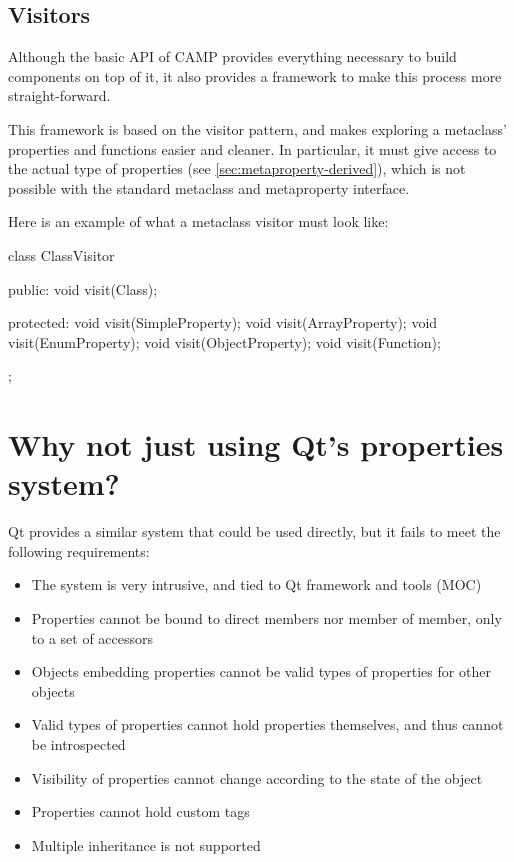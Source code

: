 \documentclass[a4paper, twoside]{report}
\begin{document}
\section{Visitors}
\label{sec:visitor}

	Although the basic API of CAMP provides everything necessary to build components on top of it, it
	also provides a framework to make this process more straight-forward.
	
	This framework is based on the visitor pattern, and makes exploring a metaclass' properties and
	functions easier and cleaner. In particular, it must give access to the actual type of properties
	(see \ref{sec:metaproperty-derived}), which is not possible with the standard metaclass and metaproperty
	interface.

	Here is an example of what a metaclass visitor must look like:
	
\begin{cppcode}
class ClassVisitor
{
public:
  void visit(Class);
    
protected:
  void visit(SimpleProperty);
  void visit(ArrayProperty);
  void visit(EnumProperty);
  void visit(ObjectProperty);
  void visit(Function);
};
\end{cppcode}

\appendix

\chapter{Why not just using Qt's properties system?}

	Qt provides a similar system that could be used directly, but it fails to meet the following requirements:
	
	\begin{itemize}
		\item The system is very intrusive, and tied to Qt framework and tools (MOC)
		\item Properties cannot be bound to direct members nor member of member, only to a set of accessors
		\item Objects embedding properties cannot be valid types of properties for other objects
		\item Valid types of properties cannot hold properties themselves, and thus cannot be introspected
		\item Visibility of properties cannot change according to the state of the object
		\item Properties cannot hold custom tags
		\item Multiple inheritance is not supported
	\end{itemize}
\end{document}
